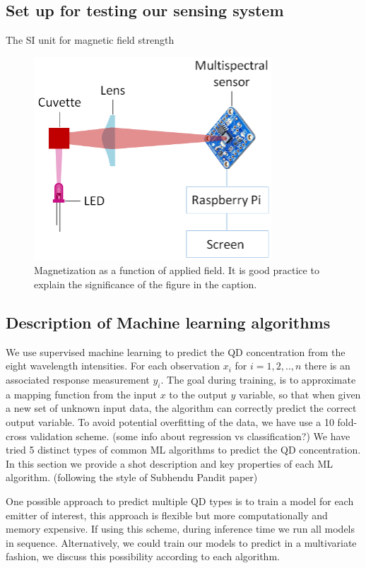 \documentclass[journal,twoside,web]{ieeecolor}
\begin{document}
\subsection{Set up for testing our sensing system}
The SI unit for magnetic field strength 

\begin{figure}[!t]
\centerline{\includegraphics{22.png}}
\caption{Magnetization as a function of applied field.
It is good practice to explain the significance of the figure in the caption.}
\label{fig1}
\end{figure}


\subsection{Description of Machine learning algorithms}

We use supervised machine learning to predict the QD concentration from the eight wavelength intensities. For each observation $x_i$ for $i = 1,2,..,n$ there is an associated response measurement $y_i$. The goal during training, is to approximate a mapping function from the input $x$ to the output $y$ variable, so that when given a new set of unknown input data, the algorithm can correctly predict the correct output variable.  To avoid potential overfitting of the data, we have use a 10 fold-cross validation scheme.
(some info about regression vs classification?)
We have tried 5 distinct types of common ML algorithms to predict the QD concentration. In this section we provide a shot description and key properties of each ML algorithm.
(following the style of Subhendu Pandit paper) 

One possible approach to predict multiple QD types is to train a model for each emitter of interest, this approach is flexible but more computationally and memory expensive. If using this scheme, during inference time we run all models in sequence. Alternatively, we could train our models to predict in a multivariate fashion, we discuss this possibility according to each algorithm. 
\end{document}
